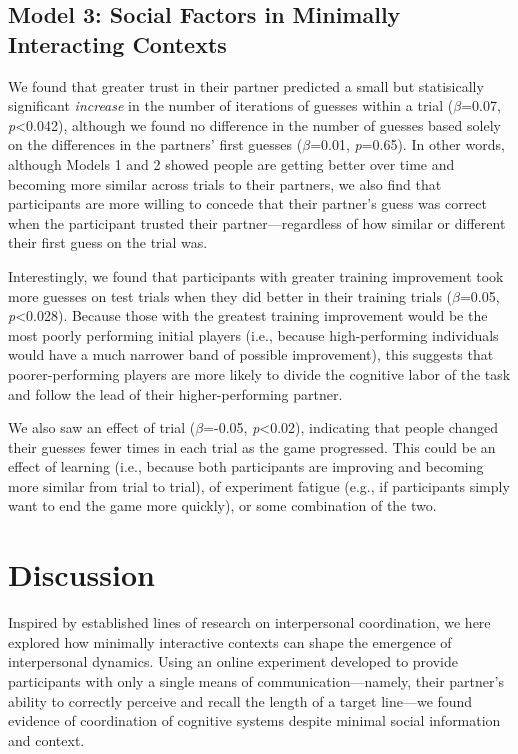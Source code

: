 \documentclass[10pt, letterpaper]{article}
\begin{document}
\subsection{Model 3: Social Factors in Minimally Interacting
Contexts}\label{model-3-social-factors-in-minimally-interacting-contexts-1}

We found that greater trust in their partner predicted a small but
statisically significant \emph{increase} in the number of iterations of
guesses within a trial (\emph{\(\beta\)}=0.07,
\emph{p}\textless{}0.042), although we found no difference in the number
of guesses based solely on the differences in the partners' first
guesses (\emph{\(\beta\)}=0.01, \emph{p}=0.65). In other words, although
Models 1 and 2 showed people are getting better over time and becoming
more similar across trials to their partners, we also find that
participants are more willing to concede that their partner's guess was
correct when the participant trusted their partner---regardless of how
similar or different their first guess on the trial was.

Interestingly, we found that participants with greater training
improvement took more guesses on test trials when they did better in
their training trials (\emph{\(\beta\)}=0.05, \emph{p}\textless{}0.028).
Because those with the greatest training improvement would be the most
poorly performing initial players (i.e., because high-performing
individuals would have a much narrower band of possible improvement),
this suggests that poorer-performing players are more likely to divide
the cognitive labor of the task and follow the lead of their
higher-performing partner.

We also saw an effect of trial (\emph{\(\beta\)}=-0.05,
\emph{p}\textless{}0.02), indicating that people changed their guesses
fewer times in each trial as the game progressed. This could be an
effect of learning (i.e., because both participants are improving and
becoming more similar from trial to trial), of experiment fatigue (e.g.,
if participants simply want to end the game more quickly), or some
combination of the two.

\section{Discussion}\label{discussion}

Inspired by established lines of research on interpersonal coordination,
we here explored how minimally interactive contexts can shape the
emergence of interpersonal dynamics. Using an online experiment
developed to provide participants with only a single means of
communication---namely, their partner's ability to correctly perceive
and recall the length of a target line---we found evidence of
coordination of cognitive systems despite minimal social information and
context.
\end{document}
